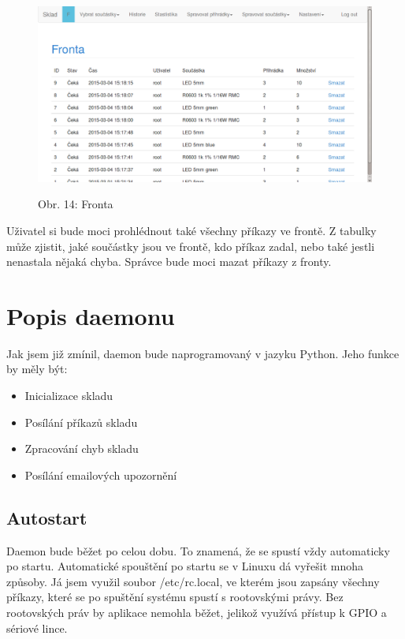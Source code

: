 \documentclass[12pt, a4paper, oneside]{article}
\begin{document}
\begin{figure}{\textwidth}
\begin{center}
\includegraphics[scale=0.5]{img/web_fronta.png}
\\
\caption{Obr. 14: Fronta}
\end{center}
\end{figure}


Uživatel si bude moci prohlédnout také všechny příkazy ve frontě. Z tabulky může zjistit, jaké součástky jsou ve frontě, kdo příkaz zadal, nebo také jestli nenastala nějaká chyba.
Správce bude moci mazat příkazy z fronty.

\section{Popis daemonu} %

Jak jsem již zmínil, daemon bude naprogramovaný v jazyku Python. Jeho funkce by měly být:

\begin{itemize}
\item Inicializace skladu
\item Posílání příkazů skladu
\item Zpracování chyb skladu
\item Posílání emailových upozornění
\end{itemize}

\subsection{Autostart}

Daemon bude běžet po celou dobu. To znamená, že se spustí vždy automaticky po startu. Automatické spouštění po startu se v Linuxu dá vyřešit mnoha způsoby. Já jsem využil soubor /etc/rc.local, ve kterém jsou zapsány všechny příkazy, které se po spuštění systému spustí s rootovskými právy. Bez rootovských práv by aplikace nemohla běžet, jelikož využívá přístup k GPIO a sériové lince.
\end{document}

